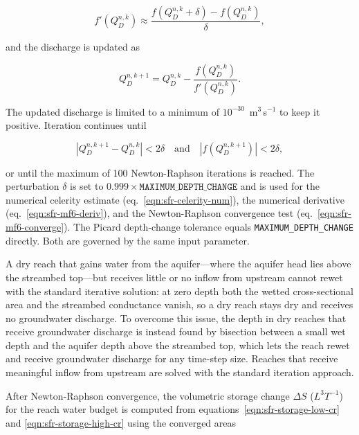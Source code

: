 \begin{equation}
	\label{eqn:sfr-mf6-deriv}
	f'\!\left(Q_D^{n,k}\right) \approx \frac{f\!\left(Q_D^{n,k} + \delta\right) - f\!\left(Q_D^{n,k}\right)}{\delta} ,
\end{equation}

\noindent and the discharge is updated as

\begin{equation}
	\label{eqn:sfr-mf6-update}
	Q_D^{n,k+1} = Q_D^{n,k} - \frac{f\!\left(Q_D^{n,k}\right)}{f'\!\left(Q_D^{n,k}\right)} .
\end{equation}

\noindent The updated discharge is limited to a minimum of $10^{-30}$~m$^3$\,s$^{-1}$ to keep it positive. Iteration continues until

\begin{equation}
	\label{eqn:sfr-mf6-converge}
	\left| Q_D^{n,k+1} - Q_D^{n,k} \right| < 2\delta
	\quad \text{and} \quad
	\left| f\!\left(Q_D^{n,k+1}\right) \right| < 2\delta ,
\end{equation}

\noindent or until the maximum of 100 Newton-Raphson iterations is reached. The perturbation $\delta$ is set to $0.999 \times \texttt{MAXIMUM\_DEPTH\_CHANGE}$ and is used for the numerical celerity estimate (eq.~\ref{eqn:sfr-celerity-num}), the numerical derivative (eq.~\ref{eqn:sfr-mf6-deriv}), and the Newton-Raphson convergence test (eq.~\ref{eqn:sfr-mf6-converge}). The Picard depth-change tolerance equals \texttt{MAXIMUM\_DEPTH\_CHANGE} directly. Both are governed by the same input parameter.

A dry reach that gains water from the aquifer---where the aquifer head lies above the streambed top---but receives little or no inflow from upstream cannot rewet with the standard iterative solution: at zero depth both the wetted cross-sectional area and the streambed conductance vanish, so a dry reach stays dry and receives no groundwater discharge. To overcome this issue, the depth in dry reaches that receive groundwater discharge is instead found by bisection between a small wet depth and the aquifer depth above the streambed top, which lets the reach rewet and receive groundwater discharge for any time-step size. Reaches that receive meaningful inflow from upstream are solved with the standard iteration approach.

After Newton-Raphson convergence, the volumetric storage change $\Delta S$ ($L^3T^{-1}$) for the reach water budget is computed from equations~\ref{eqn:sfr-storage-low-cr} and \ref{eqn:sfr-storage-high-cr} using the converged areas

